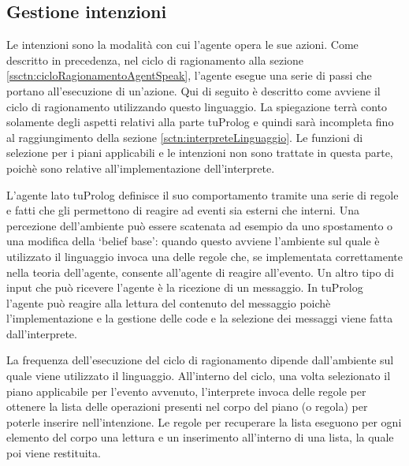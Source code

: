 \subsection{Gestione intenzioni}
Le intenzioni sono la modalità con cui l'agente opera le sue azioni. Come descritto in precedenza, nel ciclo di ragionamento alla sezione \ref{ssctn:cicloRagionamentoAgentSpeak}, l'agente esegue una serie di passi che portano all'esecuzione di un'azione.
Qui di seguito è descritto come avviene il ciclo di ragionamento utilizzando questo linguaggio. La spiegazione terrà conto solamente degli aspetti relativi alla parte tuProlog e quindi sarà incompleta fino al raggiungimento della sezione \ref{sctn:interpreteLinguaggio}. Le funzioni di selezione per i piani applicabili e le intenzioni non sono trattate in questa parte, poichè sono relative all'implementazione dell'interprete.

L'agente lato tuProlog definisce il suo comportamento tramite una serie di regole e fatti che gli permettono di reagire ad eventi sia esterni che interni. Una percezione dell'ambiente può essere scatenata ad esempio da uno spostamento o una modifica della `belief base': quando questo avviene l'ambiente sul quale è utilizzato il linguaggio invoca una delle regole che, se implementata correttamente nella teoria dell'agente, consente all'agente di reagire all'evento. Un altro tipo di input che può ricevere l'agente è la ricezione di un messaggio. In tuProlog l'agente può reagire alla lettura del contenuto del messaggio poichè l'implementazione e la gestione delle code e la selezione dei messaggi viene fatta dall'interprete.

La frequenza dell'esecuzione del ciclo di ragionamento dipende dall'ambiente sul quale viene utilizzato il linguaggio. All'interno del ciclo, una volta selezionato il piano applicabile per l'evento avvenuto, l'interprete invoca delle regole per ottenere la lista delle operazioni presenti nel corpo del piano (o regola) per poterle inserire nell'intenzione. Le regole per recuperare la lista eseguono per ogni elemento del corpo una lettura e un inserimento all'interno di una lista, la quale poi viene restituita.

